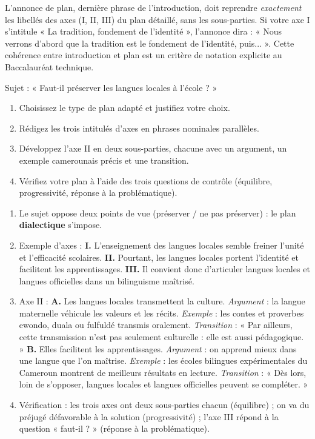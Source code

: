 \documentclass[11pt]{article}
\begin{document}
\begin{savaistu}
L'annonce de plan, dernière phrase de l'introduction, doit reprendre \emph{exactement} les libellés des axes (I, II, III) du plan détaillé, sans les sous-parties. Si votre axe I s'intitule « La tradition, fondement de l'identité », l'annonce dira : « Nous verrons d'abord que la tradition est le fondement de l'identité, puis... ». Cette cohérence entre introduction et plan est un critère de notation explicite au Baccalauréat technique.
\end{savaistu}

\begin{exercice}
Sujet : « Faut-il préserver les langues locales à l'école ? »
\begin{enumerate}
\item Choisissez le type de plan adapté et justifiez votre choix.
\item Rédigez les trois intitulés d'axes en phrases nominales parallèles.
\item Développez l'axe II en deux sous-parties, chacune avec un argument, un exemple camerounais précis et une transition.
\item Vérifiez votre plan à l'aide des trois questions de contrôle (équilibre, progressivité, réponse à la problématique).
\end{enumerate}
\end{exercice}

\begin{corrige}[Exercice]
\begin{enumerate}
\item Le sujet oppose deux points de vue (préserver / ne pas préserver) : le plan \textbf{dialectique} s'impose.
\item Exemple d'axes : \textbf{I.} L'enseignement des langues locales semble freiner l'unité et l'efficacité scolaires. \textbf{II.} Pourtant, les langues locales portent l'identité et facilitent les apprentissages. \textbf{III.} Il convient donc d'articuler langues locales et langues officielles dans un bilinguisme maîtrisé.
\item Axe II : \textbf{A.} Les langues locales transmettent la culture. \emph{Argument} : la langue maternelle véhicule les valeurs et les récits. \emph{Exemple} : les contes et proverbes ewondo, duala ou fulfuldé transmis oralement. \emph{Transition} : « Par ailleurs, cette transmission n'est pas seulement culturelle : elle est aussi pédagogique. » \textbf{B.} Elles facilitent les apprentissages. \emph{Argument} : on apprend mieux dans une langue que l'on maîtrise. \emph{Exemple} : les écoles bilingues expérimentales du Cameroun montrent de meilleurs résultats en lecture. \emph{Transition} : « Dès lors, loin de s'opposer, langues locales et langues officielles peuvent se compléter. »
\item Vérification : les trois axes ont deux sous-parties chacun (équilibre) ; on va du préjugé défavorable à la solution (progressivité) ; l'axe III répond à la question « faut-il ? » (réponse à la problématique).
\end{enumerate}
\end{corrige}
\end{document}
